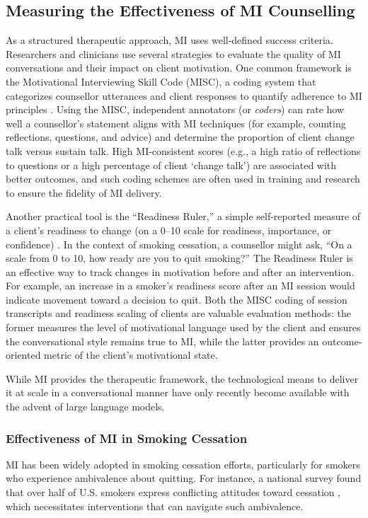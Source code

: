 \subsection*{Measuring the Effectiveness of MI Counselling}
As a structured therapeutic approach, MI uses well-defined success criteria. Researchers and clinicians use several strategies to evaluate the quality of MI conversations and their impact on client motivation. One common framework is the Motivational Interviewing Skill Code (MISC), a coding system that categorizes counsellor utterances and client responses to quantify adherence to MI principles \cite{Houck2010}. Using the MISC, independent annotators (or \emph{coders}) can rate how well a counsellor’s statement aligns with MI techniques (for example, counting reflections, questions, and advice) and determine the proportion of client change talk versus sustain talk. High MI-consistent scores (e.g., a high ratio of reflections to questions or a high percentage of client ‘change talk’) are associated with better outcomes, and such coding schemes are often used in training and research to ensure the fidelity of MI delivery.

Another practical tool is the “Readiness Ruler,” a simple self-reported measure of a client’s readiness to change (on a 0--10 scale for readiness, importance, or confidence) \cite{Boudreaux2012}. In the context of smoking cessation, a counsellor might ask, “On a scale from 0 to 10, how ready are you to quit smoking?” The Readiness Ruler is an effective way to track changes in motivation before and after an intervention. For example, an increase in a smoker’s readiness score after an MI session would indicate movement toward a decision to quit. Both the MISC coding of session transcripts and readiness scaling of clients are valuable evaluation methods: the former measures the level of motivational language used by the client and ensures the conversational style remains true to MI, while the latter provides an outcome-oriented metric of the client’s motivational state.

While MI provides the therapeutic framework, the technological means to deliver it at scale in a conversational manner have only recently become available with the advent of large language models.

\subsubsection{Effectiveness of MI in Smoking Cessation}
MI has been widely adopted in smoking cessation efforts, particularly for smokers who experience ambivalence about quitting. For instance, a national survey found that over half of U.S. smokers express conflicting attitudes toward cessation \cite{Babb2017}, which necessitates interventions that can navigate such ambivalence.

